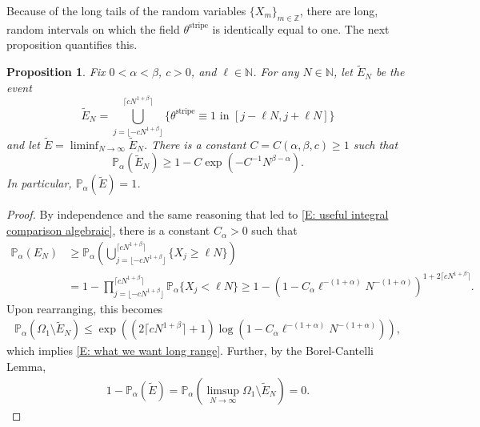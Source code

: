 \documentclass[12pt]{amsart}
\newtheorem{prop}{Proposition}
\begin{document}
Because of the long tails of the random variables $\{X_{m}\}_{m \in \mathbb{Z}}$, there are long, random intervals on which the field $\theta^{\text{stripe}}$ is identically equal to one.  The next proposition quantifies this.

	\begin{prop} \label{P: algebraic scale selection} Fix $0 < \alpha < \beta$, $c > 0$, and $\ell \in \mathbb{N}$. For any $N \in \mathbb{N}$, let $\tilde{E}_{N}$ be the event
		\begin{equation*}
			\tilde{E}_{N} = \bigcup_{j = \lfloor -cN^{1 + \beta} \rfloor}^{\lceil cN^{1 + \beta} \rceil} \{\theta^{\text{stripe}} \equiv 1 \, \, \text{in} \, \, [j - \ell N, j + \ell N]\}
		\end{equation*}
	and let $\tilde{E} = \liminf_{N \to \infty} \tilde{E}_{N}$.  There is a constant $C = C(\alpha,\beta,c) \geq 1$ such that
		\begin{equation} \label{E: what we want long range}
			\mathbb{P}_{\alpha}(\tilde{E}_{N}) \geq 1 - C \exp \left( - C^{-1} N^{\beta - \alpha} \right).
		\end{equation}
	In particular, $\mathbb{P}_{\alpha}(\tilde{E}) = 1$. \end{prop}
	
		\begin{proof} By independence and the same reasoning that led to \eqref{E: useful integral comparison algebraic}, there is a constant $C_{\alpha} > 0$ such that 
			\begin{align*}
				\mathbb{P}_{\alpha}(E_{N}) &\geq \mathbb{P}_{\alpha} \left( \bigcup_{ j = \lfloor - c N^{ 1 + \beta } \rfloor }^{ \lceil c N^{ 1 + \beta } \rceil } \{ X_{j} \geq \ell N \} \right) \\
					&= 1 - \prod_{ j = \lfloor - c N^{ 1 + \beta } \rfloor }^{ \lceil c N^{ 1 + \beta } \rceil } \mathbb{P}_{\alpha} \{ X_{j} < \ell N \} \geq 1 - \left( 1 -  C_{\alpha} \ell^{- ( 1 + \alpha ) } N^{- ( 1 + \alpha ) } \right)^{1 + 2 \lceil c N^{ 1 + \beta } \rceil }.
			\end{align*}
		Upon rearranging, this becomes
			\begin{align*}
				\mathbb{P}_{\alpha}( \Omega_{1} \setminus \tilde{E}_{N}) \leq \exp \left( (2 \lceil c N^{1 + \beta} \rceil + 1) \log \left(1 - C_{\alpha} \ell^{- ( 1 + \alpha ) }  N^{- (1 + \alpha) } \right) \right),
			\end{align*}
		which implies \eqref{E: what we want long range}.  Further, by the Borel-Cantelli Lemma, 
			\begin{align*}
		1 - \mathbb{P}_{\alpha} ( \tilde{E} ) = \mathbb{P}_{\alpha} \left(\limsup_{N \to \infty} \Omega_{1} \setminus \tilde{E}_{N} \right) = 0.
			\end{align*}
\end{proof}
	
\end{document}
